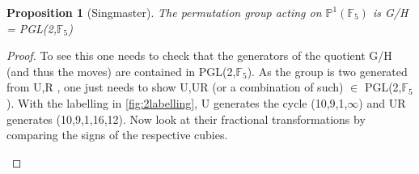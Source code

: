 \documentclass{article}
\newtheorem{proposition}[section]{Proposition}
\begin{document}
\begin{proposition}[Singmaster]
\label{Singmaster}
The permutation group acting on $\mathbb{P}^{1}(\mathbb{F}_5)$ is G/H = PGL(2,$\mathbb{F}_5$)
\end{proposition}

\begin{proof}
To see this one needs to check that the generators of the quotient G/H (and thus the moves) are contained in PGL(2,$\mathbb{F}_5$). As the group is two generated from U,R , one just needs to show U,UR (or a combination of such) $\in$ PGL(2,$\mathbb{F}_5$). With the labelling in \ref{fig:2labelling}, U generates the cycle (10,9,1,$\infty$) and UR generates (10,9,1,16,12). Now look at their fractional transformations by comparing the signs of the respective cubies.

\begin{figure}[h]
\centering
  \TwoCubeSolved%
  \TwoCubeSolved%
  \hspace{2cm}
\end{figure}


\end{proof}
\end{document}
